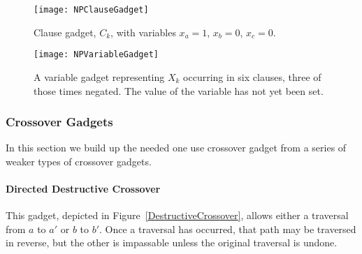 \begin{figure}[!ht]
\begin{minipage}{.36\textwidth}
    \texttt{[image: NPClauseGadget]}
    \caption{Clause gadget, $C_k$, with variables $x_a=1$, $x_b=0$, $x_c=0$.}
    \label{fig:NPClauseGadget}
\end{minipage}
\hspace{5mm}
\begin{minipage}{.57\textwidth}
  \centering
    \texttt{[image: NPVariableGadget]}
    \caption{A variable gadget representing $X_k$ occurring in six clauses, three of those times negated. The value of the variable has not yet been set.}
    \label{fig:NPVariableGadget}
\end{minipage}
\end{figure}

%

\subsubsection{Crossover Gadgets}
\label{sec:NPCrossover}
In this section we build up the needed one use crossover gadget from a series of weaker types of crossover gadgets.

\paragraph{Directed Destructive Crossover} This gadget, depicted in Figure~\ref{DestructiveCrossover}, allows either a traversal from $a$ to $a'$ or $b$ to $b'$. Once a traversal has occurred, that path may be traversed in reverse, but the other is impassable unless the original traversal is undone.

